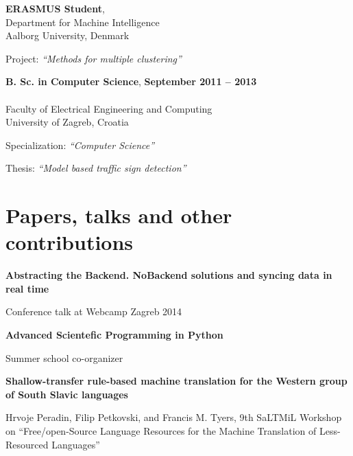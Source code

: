 \documentclass[margin,line]{resume}
\begin{document}
\begin{resume}
    \textbf{ERASMUS Student}, \\
    Department for Machine Intelligence \\
    Aalborg University, Denmark
    \vspace{1mm}%
    \begin{list2}
        \item Project: \textsl{``Methods for multiple clustering''} 
    \end{list2}


    \textbf{B. Sc. in Computer Science}, \hfill \textbf{ September 2011 -- 2013 }\vspace{-3mm}\\\vspace{-1mm}%
    \\Faculty of Electrical Engineering and Computing
    \\University of Zagreb, Croatia \vspace{1mm}%
    \textsl{} 
    \begin{list2}
        \item Specialization: \textsl{``Computer Science''} 
        \item Thesis: \textsl{``Model based traffic sign detection''} 
    \end{list2}

    \section{\mysidestyle Papers, talks and other contributions}

    \textbf{Abstracting the Backend. NoBackend solutions and syncing data in real time}
    \begin{list2}
    \item Conference talk at Webcamp Zagreb 2014
    \end{list2}

    \textbf{Advanced Scientefic Programming in Python}
    \begin{list2}
    \item Summer school co-organizer
    \end{list2}
    
    \textbf{Shallow-transfer rule-based machine translation for the Western group of South Slavic languages}
    \begin{list2}
    \item Hrvoje Peradin, Filip Petkovski, and Francis M. Tyers, 9th SaLTMiL Workshop on “Free/open-Source Language Resources for the Machine Translation of Less-Resourced Languages”
    \end{list2}


\end{resume}
\end{document}

